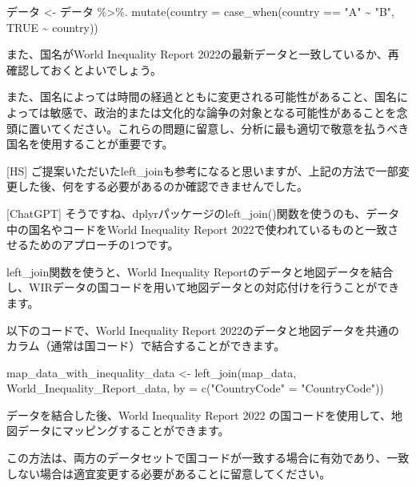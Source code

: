 \documentclass[
]{bxjsbook}
\newenvironment{Shaded}{\begin{snugshade}}{\end{snugshade}}
\newcommand{\AttributeTok}[1]{\textcolor[rgb]{0.77,0.63,0.00}{#1}}
\newcommand{\ConstantTok}[1]{\textcolor[rgb]{0.00,0.00,0.00}{#1}}
\newcommand{\FunctionTok}[1]{\textcolor[rgb]{0.00,0.00,0.00}{#1}}
\newcommand{\NormalTok}[1]{#1}
\newcommand{\OtherTok}[1]{\textcolor[rgb]{0.56,0.35,0.01}{#1}}
\newcommand{\SpecialCharTok}[1]{\textcolor[rgb]{0.00,0.00,0.00}{#1}}
\newcommand{\StringTok}[1]{\textcolor[rgb]{0.31,0.60,0.02}{#1}}
\theoremstyle{definition}
\theoremstyle{definition}
\theoremstyle{definition}
\theoremstyle{definition}
\theoremstyle{remark}
\begin{document}
\begin{Shaded}
\begin{Highlighting}[]
\NormalTok{データ }\OtherTok{\textless{}{-}}\NormalTok{ データ }\SpecialCharTok{\%\textgreater{}\%}\NormalTok{.}
\FunctionTok{mutate}\NormalTok{(}\AttributeTok{country =} \FunctionTok{case\_when}\NormalTok{(country }\SpecialCharTok{==} \StringTok{"A"} \SpecialCharTok{\textasciitilde{}} \StringTok{"B"}\NormalTok{,}
\ConstantTok{TRUE} \SpecialCharTok{\textasciitilde{}}\NormalTok{ country))}
\end{Highlighting}
\end{Shaded}

また、国名がWorld Inequality Report 2022の最新データと一致しているか、再確認しておくとよいでしょう。

また、国名によっては時間の経過とともに変更される可能性があること、国名によっては敏感で、政治的または文化的な論争の対象となる可能性があることを念頭に置いてください。これらの問題に留意し、分析に最も適切で敬意を払うべき国名を使用することが重要です。

{[}HS{]} ご提案いただいたleft\_joinも参考になると思いますが、上記の方法で一部変更した後、何をする必要があるのか確認できませんでした。

{[}ChatGPT{]} そうですね、dplyrパッケージのleft\_join()関数を使うのも、データ中の国名やコードをWorld Inequality Report 2022で使われているものと一致させるためのアプローチの1つです。

left\_join関数を使うと、World Inequality Reportのデータと地図データを結合し、WIRデータの国コードを用いて地図データとの対応付けを行うことができます。

以下のコードで、World Inequality Report 2022のデータと地図データを共通のカラム（通常は国コード）で結合することができます。

\begin{Shaded}
\begin{Highlighting}[]
\NormalTok{map\_data\_with\_inequality\_data }\OtherTok{\textless{}{-}} \FunctionTok{left\_join}\NormalTok{(map\_data, World\_Inequality\_Report\_data, }\AttributeTok{by =} \FunctionTok{c}\NormalTok{(}\StringTok{"CountryCode"} \OtherTok{=} \StringTok{"CountryCode"}\NormalTok{))}
\end{Highlighting}
\end{Shaded}

データを結合した後、World Inequality Report 2022 の国コードを使用して、地図データにマッピングすることができます。

この方法は、両方のデータセットで国コードが一致する場合に有効であり、一致しない場合は適宜変更する必要があることに留意してください。
\end{document}
